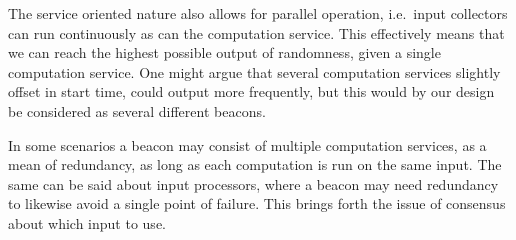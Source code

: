 The service oriented nature also allows for parallel operation, i.e.\ input collectors can run continuously as can the computation service.
This effectively means that we can reach the highest possible output of randomness, given a single computation service.
One might argue that several computation services slightly offset in start time, could output more frequently, but this would by our design be considered as several different beacons.

In some scenarios a beacon may consist of multiple computation services, as a mean of redundancy, as long as each computation is run on the same input.
The same can be said about input processors, where a beacon may need redundancy to likewise avoid a single point of failure.
This brings forth the issue of consensus about which input to use.

